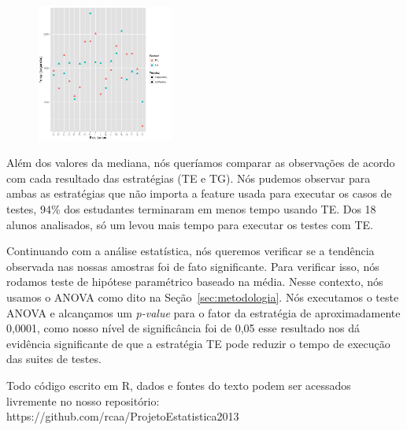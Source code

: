 \begin{figure}[t]
    \centering
    \includegraphics[width=0.4\textwidth]{images/dotplot.png}
    \caption{}
    \label{fig:dotplot}
\end{figure}

Além dos valores da mediana, nós queríamos comparar as observações de acordo com cada resultado das estratégias (TE e TG). Nós pudemos observar para ambas as estratégias que não importa a feature usada para executar os casos de testes, 94\% dos estudantes terminaram em menos tempo usando TE. Dos 18 alunos analisados, só um levou mais tempo para executar os testes com TE.

Continuando com a análise estatística, nós queremos verificar se a tendência
observada nas nossas amostras foi de fato significante. Para verificar isso, nós
rodamos teste de hipótese paramétrico baseado na média. Nesse contexto, nós
usamos o ANOVA como dito na Seção~\ref{sec:metodologia}. Nós executamos o teste
ANOVA e alcançamos um \emph{p-value} para o fator da estratégia de
aproximadamente 0,0001, como nosso nível de significância foi de 0,05 esse
resultado nos dá evidência significante de que a estratégia TE pode reduzir
o tempo de execução das suites de testes.

Todo código escrito em R, dados e fontes do texto podem ser acessados livremente no nosso repositório: \\https://github.com/rcaa/ProjetoEstatistica2013